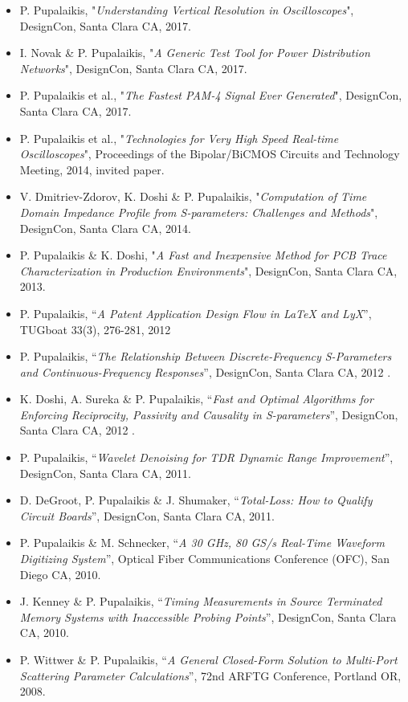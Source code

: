 \documentclass[10pt,letterpaper]{extarticle}
\newenvironment{indentsection}[1]%
{\begin{list}{}%
	{\setlength{\leftmargin}{#1}}%
	\item[]%
}
{\end{list}}
\begin{document}
\begin{indentsection}{-1em}\begin{itemize}
\parskip=-0.2em
\item P. Pupalaikis, "\emph{Understanding Vertical Resolution in Oscilloscopes}", DesignCon, Santa Clara CA, 2017.
\item I. Novak \& P. Pupalaikis, "\emph{A Generic Test Tool for Power Distribution Networks}", DesignCon, Santa Clara CA, 2017.
\item P. Pupalaikis et al., "\emph{The Fastest PAM-4 Signal Ever Generated}", DesignCon, Santa Clara CA, 2017.
\item P. Pupalaikis et al., "\emph{Technologies for Very High Speed Real-time Oscilloscopes}", Proceedings of the Bipolar/BiCMOS Circuits and Technology Meeting, 2014, invited paper.
\item  V. Dmitriev-Zdorov, K. Doshi \& P. Pupalaikis, "\emph{Computation of Time Domain Impedance Profile from S-parameters: Challenges and Methods}", DesignCon, Santa Clara CA, 2014.
\item P. Pupalaikis \& K. Doshi, "\emph{A Fast and Inexpensive Method for PCB Trace Characterization in Production Environments}", DesignCon, Santa Clara CA, 2013.
\item P. Pupalaikis, “\emph{A Patent Application Design Flow in LaTeX and LyX}”, TUGboat 33(3), 276-281, 2012
\item P. Pupalaikis, “\emph{The Relationship Between Discrete-Frequency S-Parameters and Continuous-Frequency Responses}”, DesignCon, Santa Clara CA, 2012 .
\item K. Doshi, A. Sureka \& P. Pupalaikis, “\emph{Fast and Optimal Algorithms for Enforcing Reciprocity, Passivity and Causality in S-parameters}”, DesignCon, Santa Clara CA, 2012 .
\item P. Pupalaikis, “\emph{Wavelet Denoising for TDR Dynamic Range Improvement}”, DesignCon, Santa Clara CA, 2011.
\item D. DeGroot, P. Pupalaikis \& J. Shumaker, “\emph{Total-Loss: How to Qualify Circuit Boards}”, DesignCon, Santa Clara CA, 2011. 
\item P. Pupalaikis \& M. Schnecker, “\emph{A 30 GHz, 80 GS/s Real-Time Waveform Digitizing System}”, Optical Fiber Communications Conference (OFC), San Diego CA, 2010. 
\item J. Kenney \& P. Pupalaikis, “\emph{Timing Measurements in Source Terminated Memory Systems with Inaccessible Probing Points}”, DesignCon, Santa Clara CA, 2010. 
\item P. Wittwer \& P. Pupalaikis, “\emph{A General Closed-Form Solution to Multi-Port Scattering Parameter Calculations}”, 72nd ARFTG Conference, Portland OR, 2008. 

\end{itemize}
\end{indentsection}
\end{document}
